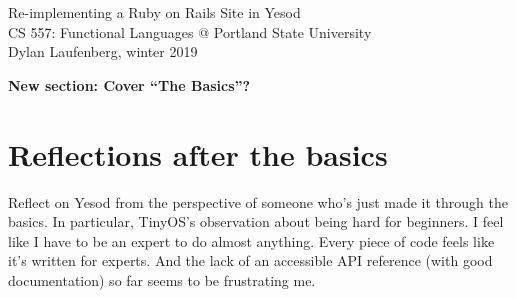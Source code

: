 \documentclass{article}
\newcommand {\todo}[1] {{\textbf{\color{red}#1}}}
\begin{document}
\begin{center}
    \Huge Re-implementing a Ruby on Rails Site in Yesod \\
    \large CS 557: Functional Languages @ Portland State University \\
    Dylan Laufenberg, winter 2019
\end{center}



\todo{New section: Cover ``The Basics''?}





\section{Reflections after the basics}

Reflect on Yesod from the perspective of someone who's just made it through the basics. In particular, TinyOS's observation about being hard for beginners. I feel like I have to be an expert to do almost anything. Every piece of code feels like it's written for experts. And the lack of an accessible API reference (with good documentation) so far seems to be frustrating me.

% 
% 
% 
% 

\printbibliography
\end{document}
